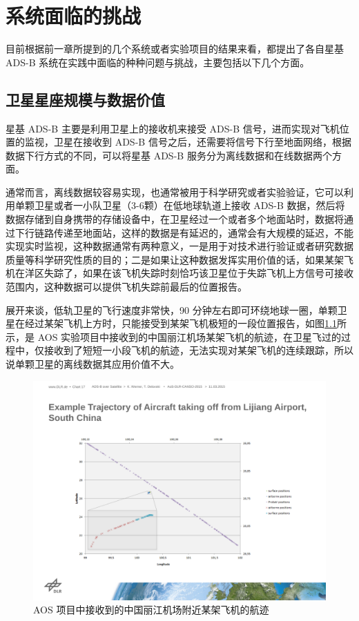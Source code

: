 
\chapter{系统面临的挑战}

目前根据前一章所提到的几个系统或者实验项目的结果来看，都提出了各自星基 ADS-B 系统在实践中面临的种种问题与挑战，主要包括以下几个方面。

\section{卫星星座规模与数据价值}

星基 ADS-B 主要是利用卫星上的接收机来接受 ADS-B 信号，进而实现对飞机位置的监视，卫星在接收到 ADS-B 信号之后，还需要将信号下行至地面网络，根据数据下行方式的不同，可以将星基 ADS-B 服务分为离线数据和在线数据两个方面。

通常而言，离线数据较容易实现，也通常被用于科学研究或者实验验证，它可以利用单颗卫星或者一小队卫星（3-6颗）在低地球轨道上接收 ADS-B 数据，然后将数据存储到自身携带的存储设备中，在卫星经过一个或者多个地面站时，数据将通过下行链路传递至地面站，这样的数据是有延迟的，通常会有大规模的延迟，不能实现实时监视，这种数据通常有两种意义，一是用于对技术进行验证或者研究数据质量等科学研究性质的目的；二是如果让这种数据发挥实用价值的话，如果某架飞机在洋区失踪了，如果在该飞机失踪时刻恰巧该卫星位于失踪飞机上方信号可接收范围内，这种数据可以提供飞机失踪前最后的位置报告。

展开来谈，低轨卫星的飞行速度非常快，90 分钟左右即可环绕地球一圈，单颗卫星在经过某架飞机上方时，只能接受到某架飞机极短的一段位置报告，如图\ref{fig:AOS-south_china}所示，是 AOS 实验项目中接收到的中国丽江机场某架飞机的航迹，在卫星飞过的过程中，仅接收到了短短一小段飞机的航迹，无法实现对某架飞机的连续跟踪，所以说单颗卫星的离线数据其应用价值不大。

\begin{figure}[!htb]
\centering
\includegraphics[width=13cm]{pic/AOS-south_china.pdf}
\caption{AOS 项目中接收到的中国丽江机场附近某架飞机的航迹\protect\footnotemark}
\label{fig:AOS-south_china}
\end{figure}

